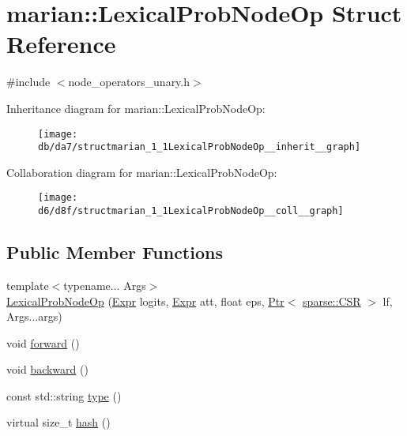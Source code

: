 \hypertarget{structmarian_1_1LexicalProbNodeOp}{}\section{marian\+:\+:Lexical\+Prob\+Node\+Op Struct Reference}
\label{structmarian_1_1LexicalProbNodeOp}


{\ttfamily \#include $<$node\+\_\+operators\+\_\+unary.\+h$>$}



Inheritance diagram for marian\+:\+:Lexical\+Prob\+Node\+Op\+:
\nopagebreak
\begin{figure}[H]
\begin{center}
\leavevmode
\texttt{[image: db/da7/structmarian\_1\_1LexicalProbNodeOp\_\_inherit\_\_graph]}
\end{center}
\end{figure}


Collaboration diagram for marian\+:\+:Lexical\+Prob\+Node\+Op\+:
\nopagebreak
\begin{figure}[H]
\begin{center}
\leavevmode
\texttt{[image: d6/d8f/structmarian\_1\_1LexicalProbNodeOp\_\_coll\_\_graph]}
\end{center}
\end{figure}
\subsection*{Public Member Functions}
\begin{DoxyCompactItemize}
\item 
{\footnotesize template$<$typename... Args$>$ }\\\hyperlink{structmarian_1_1LexicalProbNodeOp_a10af564b7706713f46ad6a16c0bf386f}{Lexical\+Prob\+Node\+Op} (\hyperlink{namespacemarian_a498d8baf75b754011078b890b39c8e12}{Expr} logits, \hyperlink{namespacemarian_a498d8baf75b754011078b890b39c8e12}{Expr} att, float eps, \hyperlink{namespacemarian_ad1a373be43a00ef9ce35666145137b08}{Ptr}$<$ \hyperlink{classmarian_1_1sparse_1_1CSR}{sparse\+::\+C\+SR} $>$ lf, Args...\+args)
\item 
void \hyperlink{structmarian_1_1LexicalProbNodeOp_aaa0bb6a2dd3d270abfabc505bffedb50}{forward} ()
\item 
void \hyperlink{structmarian_1_1LexicalProbNodeOp_a494a1751a4a92064d0b6f88672e67e69}{backward} ()
\item 
const std\+::string \hyperlink{structmarian_1_1LexicalProbNodeOp_a33bc4b8ebb28aa7bf86285dd36277523}{type} ()
\item 
virtual size\+\_\+t \hyperlink{structmarian_1_1LexicalProbNodeOp_af637f59c3fcdf6f2804685818661b1ca}{hash} ()
\end{DoxyCompactItemize}
